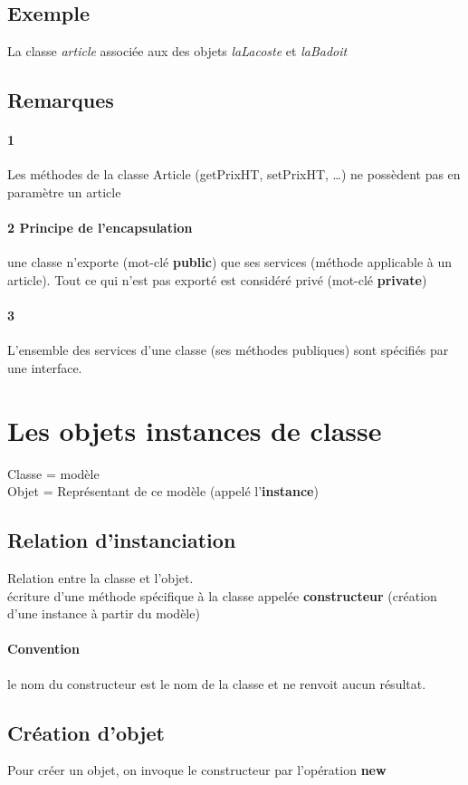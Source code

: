 	\subsection{Exemple}
	La classe \textit{article} associée aux des objets \textit{laLacoste} et \textit{laBadoit}
		
	\subsection{Remarques}
	\paragraph{1} Les méthodes de la classe Article (getPrixHT, setPrixHT, \ldots) ne possèdent
	pas en paramètre un article
	\paragraph{2 Principe de l'encapsulation} une classe n'exporte (mot-clé \textbf{public}) 
	que ses services (méthode applicable à un article). Tout ce qui n'est pas exporté est 
	considéré privé (mot-clé \textbf{private})

	\paragraph{3} L'ensemble des services d'une classe (ses méthodes publiques) sont spécifiés 
	par une interface.
\section{Les objets instances de classe}
	Classe = modèle \\
	Objet = Représentant de ce modèle (appelé l'\textbf{instance})
	\newpage
	\subsection{Relation d'instanciation}
		Relation entre la classe et l'objet. \\
		écriture d'une méthode spécifique à la classe appelée \textbf{constructeur} 
		(création d'une instance à partir du modèle)
		\paragraph{Convention} le nom du constructeur est le nom de la classe et ne renvoit
		aucun résultat.
			
	\subsection{Création d'objet}
		Pour créer un objet, on invoque le constructeur par l'opération \textbf{new}
